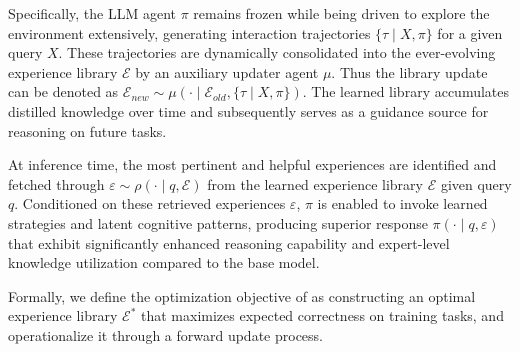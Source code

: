 Specifically, the LLM agent $\pi$ remains frozen while being driven to explore the environment extensively, generating interaction trajectories $\{\tau \mid X, \pi\}$ for a given query $X$.
These trajectories are dynamically consolidated into the ever-evolving experience library $\mathcal{E}$ by an auxiliary updater agent $\mu$. 
Thus the library update can be denoted as $\mathcal{E}_{new}\sim\mu(\cdot\mid\mathcal{E}_{old},\{\tau\mid X,\pi\})$. The learned library accumulates distilled knowledge over time and subsequently serves as a guidance source for reasoning on future tasks.

At inference time, the most pertinent and helpful experiences are identified and fetched through $\varepsilon\sim\rho(\cdot\mid q,\mathcal{E})$ from the learned experience library $\mathcal{E}$ given query $q$.  
Conditioned on these retrieved experiences $\varepsilon$, $\pi$ is enabled to invoke learned strategies and latent cognitive patterns, producing superior response $\pi(\cdot \mid q, \varepsilon)$ that exhibit significantly enhanced reasoning capability and expert-level knowledge utilization compared to the base model.

Formally, we define the optimization objective of \method{} as constructing an optimal experience library $\mathcal{E^*}$ that maximizes expected correctness on training tasks, and operationalize it through a forward update process.
